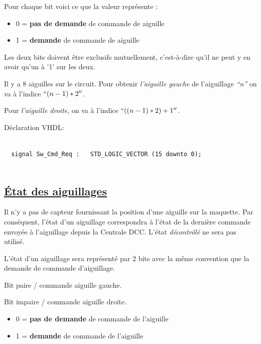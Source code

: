 \medskip

Pour chaque bit voici ce que la valeur représente :
\begin{itemize}
\item 0 = \textbf{pas de demande} de commande de aiguille
\item 1 = \textbf{demande} de commande de aiguille
\end{itemize}
Les deux bits doivent être exclusifs mutuellement, c'est-à-dire qu'il ne peut y en avoir
qu'un à '1' sur les deux.

\medskip


Il y a 8 aiguilles sur le circuit. Pour obtenir \emph{l'aiguille gauche} de
l'aiguillage \emph{``n''} on va à l'indice $``(n-1)*2''$.

Pour \emph{l'aiguille droite}, on va à l'indice $``((n-1)*2) + 1''$.

\bigskip


Déclaration VHDL:
\begin{lstlisting}[style=vhdl]
  
  signal Sw_Cmd_Req :   STD_LOGIC_VECTOR (15 downto 0);
  
\end{lstlisting}

\newpage

\subsection{\underline{\'Etat des aiguillages}}
\label{sec:ixl_aig}

Il n'y a pas de capteur fournissant la position d'une aiguille sur la
maquette.  Par conséquent, l'état d'un aiguillage correspondra à l'état
de la dernière commande envoyée à l'aiguillage depuis la Centrale DCC.
L'état \emph{décontrôlé} ne sera pas utilisé.
 
L'état d'un aiguillage sera représenté par 2 bits avec la même
convention que la demande de commande d'aiguillage. 

Bit paire / commande aiguille gauche.

Bit impaire / commande aiguille droite.

\medskip

\begin{itemize}
\item 0 = \textbf{pas de demande} de commande de l'aiguille
\item 1 = \textbf{demande} de commande de l'aiguille
\end{itemize}

